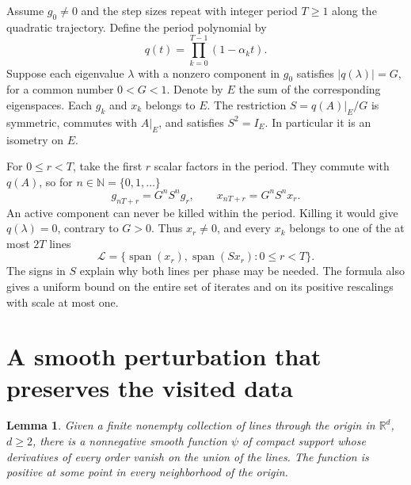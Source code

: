 \documentclass[11pt]{article}
\newtheorem{lemma}[theorem]{Lemma}
\newcommand{\R}{\mathbb R}
\newcommand{\N}{\mathbb N}
\begin{document}
Assume \(g_0\ne0\) and the step sizes repeat with integer period \(T\ge1\)
along the quadratic
trajectory. Define the period polynomial by
\[
 q(t)=\prod_{k=0}^{T-1}(1-\alpha_k t).
\]
Suppose each eigenvalue \(\lambda\) with a nonzero component in \(g_0\)
satisfies \(|q(\lambda)|=G\), for a common number \(0<G<1\). Denote by
\(E\) the sum of the corresponding eigenspaces. Each \(g_k\) and \(x_k\)
belongs to \(E\). The restriction \(S=q(A)|_E/G\) is symmetric,
commutes with \(A|_E\), and satisfies \(S^2=I_E\). In particular
it is an isometry on \(E\).

For \(0\le r<T\), take the first \(r\) scalar factors in the period.
They commute with \(q(A)\), so for \(n\in\N=\{0,1,\ldots\}\)
\begin{equation}
 g_{nT+r}=G^n S^n g_r,\qquad
 x_{nT+r}=G^n S^n x_r .
 \label{eq:period}
\end{equation}
An active component can never be killed within the period. Killing it
would give \(q(\lambda)=0\), contrary to \(G>0\). Thus \(x_r\ne0\), and
every \(x_k\) belongs to one of the at most \(2T\) lines
\begin{equation}
 \mathcal L=\{\operatorname{span}(x_r),\operatorname{span}(Sx_r)
                 :0\le r<T\}.
 \label{eq:lines}
\end{equation}
The signs in \(S\) explain why both lines per phase may be needed.
The formula also gives a uniform bound on the entire set of iterates
and on its positive rescalings with scale at most one.

\section{A smooth perturbation that preserves the visited data}

\begin{lemma}\label{lem:flat}
Given a finite nonempty collection of lines through the origin in
\(\R^d\), \(d\ge2\), there is a nonnegative smooth function \(\psi\)
of compact support whose derivatives of every order vanish on the
union of the lines. The function is positive at some point in every
neighborhood of the origin.
\end{lemma}
\end{document}
